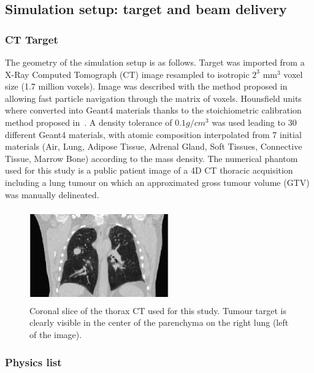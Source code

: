 \documentclass[11pt]{iopart}
\begin{document}

\subsection{Simulation setup: target and beam delivery}

\subsubsection{CT Target}

The geometry of the simulation setup is as follows. Target was
imported from a X-Ray Computed Tomograph (CT) image resampled to
isotropic $2^3$ mm$^3$ voxel size (1.7 million voxels). Image was
described with the method proposed in~\cite{Sarrut2008} allowing fast
particle navigation through the matrix of voxels. Hounsfield units
where converted into Geant4 materials thanks to the stoichiometric
calibration method proposed in~\cite{Schneider2000a}. A density
tolerance of $0.1 g/cm^3$ was used leading to $30$ different Geant4
materials, with atomic composition interpolated from 7 initial
materials (Air, Lung, Adipose Tissue, Adrenal Gland, Soft Tissues,
Connective Tissue, Marrow Bone) according to the mass density. The
numerical phantom used for this study is a public patient image of a
4D CT thoracic acquisition~\cite{Vandemeulebroucke2007} including a
lung tumour on which an approximated gross tumour volume (GTV) was
manually delineated.

\begin{figure}[!h]
\centering
\includegraphics[width=6cm,height=40mm]{figures/phantomCT.jpg}
\caption{Coronal slice of the thorax CT used for this study. Tumour
  target is clearly visible in the center of the parenchyma on the
  right lung (left of the image).}
\label{fig00}
\end{figure}

\subsubsection{Physics list}
\end{document}
